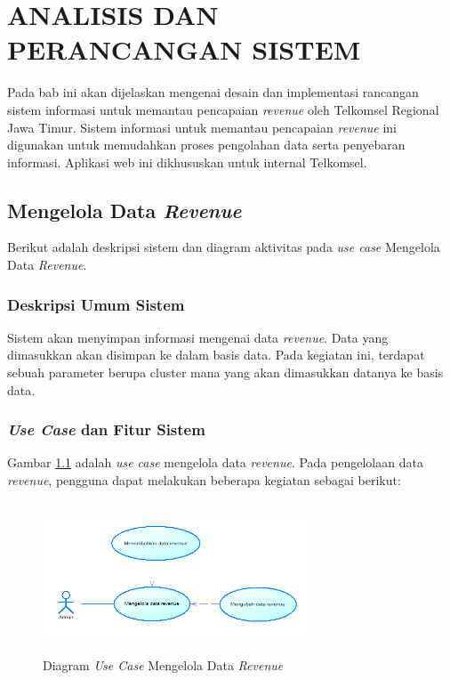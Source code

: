 \chapter{ANALISIS DAN PERANCANGAN SISTEM}
\tab Pada bab ini akan dijelaskan mengenai desain dan implementasi rancangan sistem informasi untuk memantau pencapaian \textit{revenue} oleh Telkomsel Regional Jawa Timur. Sistem informasi untuk memantau pencapaian \textit{revenue} ini digunakan untuk memudahkan proses pengolahan data serta penyebaran informasi. Aplikasi web ini dikhususkan untuk internal Telkomsel.

\section{Mengelola Data \textit{Revenue}}
Berikut adalah deskripsi sistem dan diagram aktivitas pada \textit{use case} Mengelola Data \textit{Revenue}.

\subsection{Deskripsi Umum Sistem}
\tab Sistem akan menyimpan informasi mengenai data \textit{revenue}. Data yang dimasukkan akan disimpan ke dalam basis data. Pada kegiatan ini, terdapat sebuah parameter berupa cluster mana yang akan dimasukkan datanya ke basis data.

\subsection{\textit{Use Case} dan Fitur Sistem}
Gambar \ref{figure:use_case_mengelola_data_revenue} adalah \textit{use case} mengelola data \textit{revenue}. Pada pengelolaan data \textit{revenue}, pengguna dapat melakukan beberapa kegiatan sebagai berikut:

	\begin{figure}[h]
		\centerline {\includegraphics[width=8cm,height=4.5cm]{bab4/use_case_mengelola_data_revenue.png}}
		\caption{Diagram \textit{Use Case} Mengelola Data \textit{Revenue}}
		\label{figure:use_case_mengelola_data_revenue}
	\end{figure}
	
